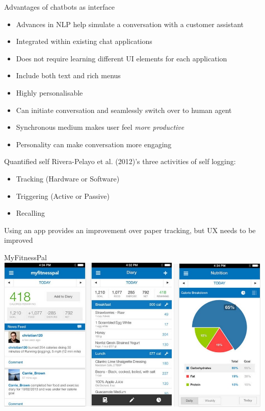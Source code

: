 \documentclass[landscape]{infslides}
\begin{document}
\begin{slide}{Advantages of chatbots as interface}
    \begin{itemize}\shrinklist
        \item Advances in NLP help simulate a conversation with a customer assistant
        \item Integrated within existing chat applications
        \item Does not require learning different UI elements for each application
        \item Include both text and rich menus
        \item Highly personalisable
        \item Can initiate conversation and seamlessly switch over to human agent
        \item Synchronous medium makes user feel \textit{more productive}
        \item Personality can make conversation more engaging
    \end{itemize}

\end{slide}
\begin{slide}{Quantified self}
    Rivera-Pelayo et al. (2012)'s three activities of self logging:
    \begin{itemize}
        \item Tracking (Hardware or Software)
        \item Triggering (Active or Passive)
        \item Recalling 
    \end{itemize}
    Using an app provides an improvement over paper tracking, but UX needs to be improved
\end{slide}
\begin{slide}{MyFitnessPal}
    \centering
    \includegraphics[height=0.85\textheight]{MyFitnessPal.jpg}
\end{slide}
\end{document}
